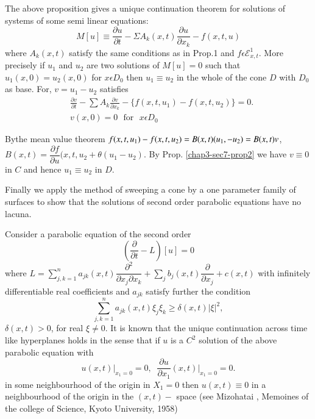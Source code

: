 \begin{remark}%
The above proposition gives a unique continuation theorem for
solutions of systems of some semi linear equations: 
\begin{equation}
M[u] \equiv \frac{\partial u}{\partial t} - \Sigma A_k (x, t) \frac{
  \partial u}{ \partial x_k}-f (x, t, u)
\tag{7.13} \label{chap3-eq7.13} 
\end{equation}
where $A_k (x, t)$ satisfy the same conditions as in Prop.1 and $f
\epsilon \mathscr{E}^1_{x, t}$. More precisely if $u_1$ and  $u_2$ are
two solutions of $M[u]=0$ such that $u_1(x, 0) = u_2 (x, 0)$ for $x
\epsilon D_0$ then $u_1 \equiv u_2$ in the whole of the cone $D$ with
$D_0$ as base. For, $v = u_1-u_2$ satisfies 
\begin{align*}
& \frac{\partial v}{\partial t}- \sum A_k \frac{\partial v}{\partial x_k}- \{f
(x, t, u_1)-f (x, t, u_2) \} = 0. \tag{7.14} \label{chap3-eq7.14}\\
&  v(x, 0) = 0 \text{~ for~ } x \epsilon D_0
\end{align*}
\end{remark}

By\pageoriginale the mean value theorem $f(x, t, u_1) - f(x, t, u_2) =
B(x, t) (u_1,- u_2)\break = B(x, t) v$, $B(x, t)= \dfrac{\partial f}{\partial
  u} (x, t, u_2 +\theta (u_1 - u_2)$. By
Prop. \ref{chap3-sec7-prop2} we have $v \equiv 0$ 
in $C$ and hence $u_1 \equiv u_2 $ in $D$. 

Finally we apply the method of sweeping a cone by a one parameter
family of surfaces to show that the solutions of second order parabolic
equations have no lacuna. 

Consider a parabolic equation of the second order 
\begin{equation*}
\left(\frac{\partial}{\partial t} -L\right) [ u ] = 0
\tag{7.15}\label{chap3-eq7.15} 
\end{equation*}
where $L = \sum\limits_{j, k = 1}^{n} a_{jk} (x, t)
\dfrac{\partial^2}{\partial x_j \partial x_k} + \sum\limits_j b_j (x,
t) \dfrac{\partial}{\partial x_j} + c(x, t)$ with infinitely
differentiable real coefficients and $a_{jk}$ satisfy further the
condition  
\begin{equation*}
\sum\limits^n_{j, k = 1} a_{jk}(x, t) \xi_j \xi_k \geq \delta (x, t) |
\xi|^2, \tag{7.16}\label{chap3-eq7.16}
\end{equation*}
$\delta (x, t) > 0$, for real $\xi \neq 0$. It is known that the unique
continuation across time like hyperplanes holds in the sense that if
$u$ is a $C^2$ solution of the above parabolic equation with  
$$
u(x, t) \big|_{x_1 = 0} = 0, \;\; \frac{\partial u}{\partial x_1} (x, t)
\big|_{x_1 = 0} = 0. 
$$
in some neighbourhood of the origin in $X_1 = 0$ then $u (x, t) \equiv
0$ in a neighbourhood of the origin in the $(x, t)-$ space (see
Mizohatai \cite{key4}, Memoines of the college of Science, Kyoto University,
1958) 


